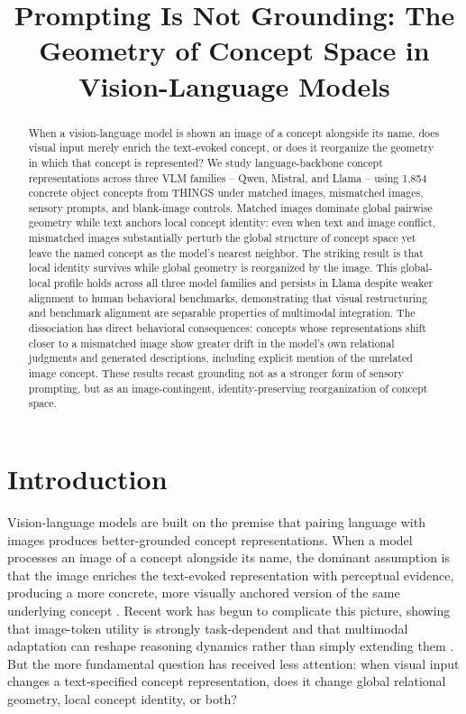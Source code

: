 \documentclass{article}
\title{Prompting Is Not Grounding: The Geometry of Concept Space in Vision-Language Models}
\author{}
\begin{document}
\maketitle

\begin{abstract}
When a vision-language model is shown an image of a concept alongside its name, does visual input merely enrich the text-evoked concept, or does it reorganize the geometry in which that concept is represented? We study language-backbone concept representations across three VLM families -- Qwen, Mistral, and Llama -- using 1,854 concrete object concepts from THINGS under matched images, mismatched images, sensory prompts, and blank-image controls. Matched images dominate global pairwise geometry while text anchors local concept identity: even when text and image conflict, mismatched images substantially perturb the global structure of concept space yet leave the named concept as the model's nearest neighbor. The striking result is that local identity survives while global geometry is reorganized by the image. This global-local profile holds across all three model families and persists in Llama despite weaker alignment to human behavioral benchmarks, demonstrating that visual restructuring and benchmark alignment are separable properties of multimodal integration. The dissociation has direct behavioral consequences: concepts whose representations shift closer to a mismatched image show greater drift in the model's own relational judgments and generated descriptions, including explicit mention of the unrelated image concept. These results recast grounding not as a stronger form of sensory prompting, but as an image-contingent, identity-preserving reorganization of concept space.
\end{abstract}

\section{Introduction}

Vision-language models are built on the premise that pairing language with images produces better-grounded concept representations. When a model processes an image of a concept alongside its name, the dominant assumption is that the image enriches the text-evoked representation with perceptual evidence, producing a more concrete, more visually anchored version of the same underlying concept \citep{radford2021clip,li2023blip2}. Recent work has begun to complicate this picture, showing that image-token utility is strongly task-dependent and that multimodal adaptation can reshape reasoning dynamics rather than simply extending them \citep{ratzlaff2025trainingfree,ghosh2026image_tokens}. But the more fundamental question has received less attention: when visual input changes a text-specified concept representation, does it change global relational geometry, local concept identity, or both?
\end{document}
